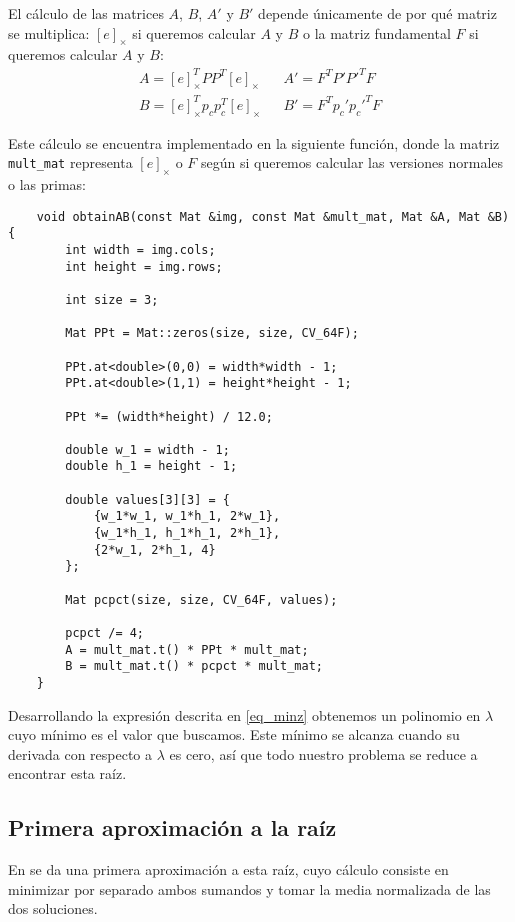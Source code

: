 \documentclass[a4paper, 11pt]{article}
\theoremstyle{definition}
\begin{document}
    El cálculo de las matrices $A$, $B$, $A'$ y $B'$ depende únicamente de por qué matriz se multiplica: $[e]_\times$ si queremos calcular $A$ y $B$ o la matriz fundamental $F$ si queremos calcular $A$ y $B$:
    \begin{align*}
        A = [e]_\times^T P P^T [e]_\times && A' = F^T P' P'^T F \\
        B = [e]_\times^T p_c p_c^T [e]_\times && B' = F^T p_c' p_c'^T F
    \end{align*}

    Este cálculo se encuentra implementado en la siguiente función, donde la matriz \lstinline{mult_mat} representa $[e]_\times$ o $F$ según si queremos calcular las versiones normales o las primas:
    \begin{lstlisting}
    void obtainAB(const Mat &img, const Mat &mult_mat, Mat &A, Mat &B){
        int width = img.cols;
        int height = img.rows;

        int size = 3;

        Mat PPt = Mat::zeros(size, size, CV_64F);

        PPt.at<double>(0,0) = width*width - 1;
        PPt.at<double>(1,1) = height*height - 1;

        PPt *= (width*height) / 12.0;

        double w_1 = width - 1;
        double h_1 = height - 1;

        double values[3][3] = {
            {w_1*w_1, w_1*h_1, 2*w_1},
            {w_1*h_1, h_1*h_1, 2*h_1},
            {2*w_1, 2*h_1, 4}
        };

        Mat pcpct(size, size, CV_64F, values);

        pcpct /= 4;
        A = mult_mat.t() * PPt * mult_mat;
        B = mult_mat.t() * pcpct * mult_mat;
    }
    \end{lstlisting}

    Desarrollando la expresión descrita en \ref{eq_minz} obtenemos un polinomio en $\lambda$ cuyo mínimo es el valor que buscamos. Este mínimo se alcanza cuando su derivada con respecto a $\lambda$ es cero, así que todo nuestro problema se reduce a encontrar esta raíz.

    \subsection{Primera aproximación a la raíz}

    En \cite{LoopZhang} se da una primera aproximación a esta raíz, cuyo cálculo consiste en minimizar por separado ambos sumandos y tomar la media normalizada de las dos soluciones.
\end{document}
